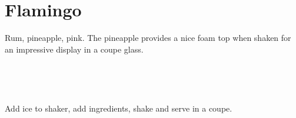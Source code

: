 \section[Flamingo]{Flamingo}

\begin{recipestats}[
        servings=1,
        preptime=5 \minute,
        source=Mike \& Jane,
        original=\citefield{bonnevilleCocktailCollectionRumIII}{shorttitle}
        \cite{bonnevilleCocktailCollectionRumIII},
    ]
\end{recipestats}

\begin{recipeabstract}
    Rum, pineapple, pink.
    The pineapple provides a nice foam top when shaken for an impressive
    display in a coupe glass.
\end{recipeabstract}

\begin{ingredientcolumns}
    \begin{ingredientblock}
        \\
    \end{ingredientblock}
    \begin{ingredientblock}
        \\
    \end{ingredientblock}
\end{ingredientcolumns}

\begin{preparation}
\item Add ice to shaker, add ingredients, shake and serve in a coupe.
\end{preparation}

\recipeend
